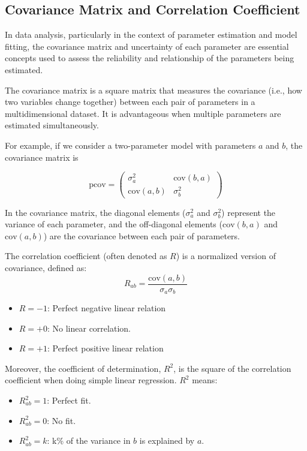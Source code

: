 \documentclass[12pt,a4paper]{article}
\begin{document}
\begin{CJK}{UTF8}{bkai}
\subsection{Covariance Matrix and Correlation Coefficient}
\hfill

In data analysis, particularly in the context of parameter estimation and model fitting, the covariance matrix and uncertainty of each parameter are essential concepts used to assess the reliability and relationship of the parameters being estimated.

The covariance matrix is a square matrix that measures the covariance (i.e., how two variables change together) between each pair of parameters in a multidimensional dataset. It is advantageous when multiple parameters are estimated simultaneously.

For example, if we consider a two-parameter model with parameters $a$ and $b$, the covariance matrix is

\begin{equation}
    \text{pcov} = 
    \begin{pmatrix} 
    \sigma_a^2 & \text{cov}(b, a) \\
    \text{cov}(a, b) & \sigma_b^2 
    \end{pmatrix}
\end{equation}

In the covariance matrix,  the diagonal elements ($\sigma_a^2$ and $\sigma_b^2$) represent the variance of each parameter, and the off-diagonal elements ($\text{cov}(b, a)$ and $\text{cov}(a, b)$) are the covariance between each pair of parameters. 


The correlation coefficient (often denoted as $R$) is a normalized version of covariance, defined as:
\begin{equation}
    R_{ab} = \frac{\text{cov}(a, b)}{\sigma_a\sigma_b}
\end{equation}

\begin{itemize}
    \item $R=-1$: Perfect negative linear relation
    \item $R=+0$: No linear correlation.
    \item $R=+1$: Perfect positive linear relation
\end{itemize}


Moreover, the coefficient of determination, $R^2$, is the square of the correlation coefficient when doing simple linear regression. $R^2$ means:
\begin{itemize}
    \item $R_{ab}^2=1$: Perfect fit.
    \item $R_{ab}^2=0$: No fit.
    \item $R_{ab}^2=k$: k\% of the variance in $b$ is explained by $a$.
\end{itemize}


\end{CJK}
\end{document}
